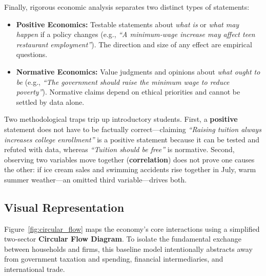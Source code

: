 \documentclass[11pt,letterpaper]{article}
\begin{document}
Finally, rigorous economic analysis separates two distinct types of statements:
\begin{itemize}
    \item \textbf{Positive Economics:} Testable statements about \emph{what is} or \emph{what may happen} if a policy changes (e.g., \emph{``A minimum-wage increase may affect teen restaurant employment''}). The direction and size of any effect are empirical questions.
    \item \textbf{Normative Economics:} Value judgments and opinions about \emph{what ought to be} (e.g., \emph{``The government should raise the minimum wage to reduce poverty''}). Normative claims depend on ethical priorities and cannot be settled by data alone.
\end{itemize}

\begin{tcolorbox}[colback=yellow!10!white,colframe=orange!80!black,title=\textbf{Clear It Up: Positive Does Not Mean ``True,'' and Correlation Is Not Causation}]
Two methodological traps trip up introductory students. First, a \textbf{positive} statement does not have to be factually correct—claiming \emph{``Raising tuition always increases college enrollment''} is a positive statement because it can be tested and refuted with data, whereas \emph{``Tuition should be free''} is normative. Second, observing two variables move together (\textbf{correlation}) does not prove one causes the other: if ice cream sales and swimming accidents rise together in July, warm summer weather—an omitted third variable—drives both.
\end{tcolorbox}

\subsection*{Visual Representation}
Figure~\ref{fig:circular_flow} maps the economy's core interactions using a simplified two-sector \textbf{Circular Flow Diagram}. To isolate the fundamental exchange between households and firms, this baseline model intentionally abstracts away from government taxation and spending, financial intermediaries, and international trade.
\end{document}
